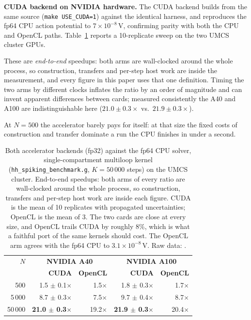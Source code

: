 \documentclass[preprint,12pt, a4paper]{elsarticle}
\begin{document}
\begin{enumerate}
\textbf{CUDA backend on NVIDIA hardware.} The CUDA backend builds from the same source (\texttt{make USE\_CUDA=1}) against the identical harness, and reproduces the fp64 CPU action potential to $7\times10^{-8}$\,V, confirming parity with both the CPU and OpenCL paths. Table~\ref{tab:cuda} reports a 10-replicate sweep on the two UMCS cluster GPUs.

These are \emph{end-to-end} speedups: both arms are wall-clocked around the whole process, so construction, transfers and per-step host work are inside the measurement, and every figure in this paper uses that one definition. Timing the two arms by different clocks inflates the ratio by an order of magnitude and can invent apparent differences between cards; measured consistently the A40 and A100 are indistinguishable here ($21.0\pm0.3\times$ vs.\ $21.9\pm0.3\times$).

At $N=500$ the accelerator barely pays for itself: at that size the fixed costs of construction and transfer dominate a run the CPU finishes in under a second.

\begin{table}[!h]
\centering
\small
\begin{tabular}{|r|r|r|r|r|}
\hline
\textbf{$N$} & \multicolumn{2}{c|}{\textbf{NVIDIA A40}} & \multicolumn{2}{c|}{\textbf{NVIDIA A100}} \\
             & \textbf{CUDA} & \textbf{OpenCL} & \textbf{CUDA} & \textbf{OpenCL} \\
\hline
500     & 1.5 $\pm$ 0.1$\times$ & 1.5$\times$ & 1.8 $\pm$ 0.3$\times$ & 1.7$\times$ \\
\hline
5\,000  & 8.7 $\pm$ 0.3$\times$ & 7.5$\times$ & 9.7 $\pm$ 0.4$\times$ & 8.7$\times$ \\
\hline
50\,000 & \textbf{21.0 $\pm$ 0.3}$\times$ & 19.2$\times$ & \textbf{21.9 $\pm$ 0.3}$\times$ & 20.4$\times$ \\
\hline
\end{tabular}
\caption{Both accelerator backends (fp32) against the fp64 CPU solver, single-compartment multiloop kernel (\texttt{hh\_spiking\_benchmark.g}, $K=50\,000$ steps) on the UMCS cluster. End-to-end speedups: both arms of every ratio are wall-clocked around the whole process, so construction, transfers and per-step host work are inside each figure. CUDA is the mean of 10 replicates with propagated uncertainties; OpenCL is the mean of 3. The two cards are close at every size, and OpenCL trails CUDA by roughly 8\%, which is what a faithful port of the same kernels should cost. The OpenCL arm agrees with the fp64 CPU to $3.1\times10^{-8}$\,V. Raw data: \protect{}.}
\label{tab:cuda}
\end{table}


\end{enumerate}
\end{document}
